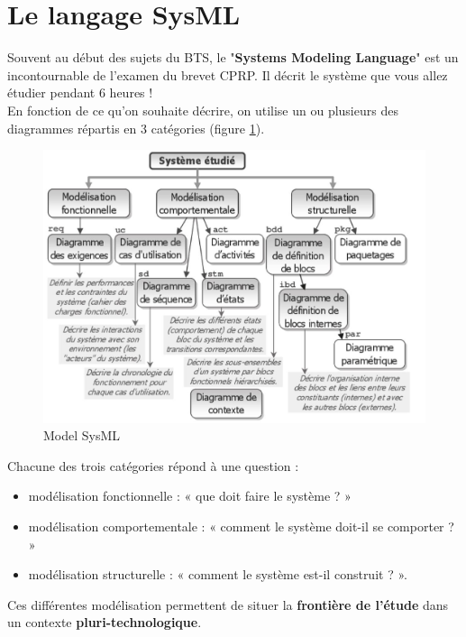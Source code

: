 \documentclass[
	11pt, %
	fleqn, %
	a4paper, %
]{LegrandOrangeBook}
\begin{document}
\section{Le langage SysML}
Souvent au début des sujets du BTS, le "\textbf{Systems Modeling Language}" est un incontournable de l'examen du brevet CPRP. Il décrit le système que vous allez étudier pendant 6 heures !\\
En fonction de ce qu'on souhaite décrire, on utilise un ou plusieurs des diagrammes répartis en 3 catégories (figure \ref{Sys1}).

\begin{figure}[H] %
	\centering %
	\includegraphics[width=1\textwidth]{Images/Sys1.JPG} %
	\caption{Model SysML}
	\label{Sys1} %
\end{figure}

Chacune des trois catégories répond à une question :
\begin{itemize}
    \item modélisation fonctionnelle : « que doit faire le système ? »
    \item modélisation comportementale : « comment le système doit-il se comporter ? »
    \item modélisation structurelle : « comment le système est-il construit ? ».
\end{itemize}
Ces différentes modélisation permettent de situer la \textbf{frontière de l’étude} dans un contexte \textbf{pluri-technologique}. 
\end{document}
